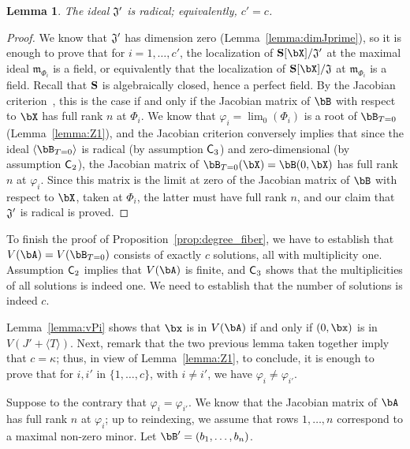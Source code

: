 \documentclass[12pt]{article}
\newtheorem{lemma}[definition]{Lemma}
\begin{document}
\begin{lemma}\label{lemma:Jprimerad}
  The ideal $\frak{J}'$ is radical; equivalently, $c'=c$.
\end{lemma}
\begin{proof}
  We know that $\frak{J}'$ has dimension zero
  (Lemma~\ref{lemma:dimJprime}), so it is enough to prove that for
  $i=1,\dots,c'$, the localization of $\SS[\bX]/\frak{J}'$ at the
  maximal ideal $\mathfrak{m}_{\Phi_i}$ is a field, or equi\-valently
  that the localization of $\SS[\bX]/\frak{J}$ at
  $\mathfrak{m}_{\Phi_i}$ is a field.  Recall that $\mathbf{S}$ is
  algebraically closed, hence a perfect field. By the Jacobian
  criterion~\cite[Theorem~16.19.b]{Eisenbud95}, this is the case if
  and only if the Jacobian matrix of $\bB$ with respect to $\bX$ has
  full rank $n$ at $\Phi_i$. We know that $\varphi_i=\lim_0(\Phi_i)$
  is a root of $\bB_{T=0}$ (Lemma~\ref{lemma:Z1}), and the Jacobian
  criterion conversely implies that since the ideal $\langle \bB_{T=0}
  \rangle$ is radical (by assumption $\mathsf{C}_3$) and zero-dimensional
  (by assumption $\mathsf{C}_2$), the Jacobian matrix of
  $\bB_{T=0}(\bX)=\bB(0,\bX)$ has full rank $n$ at $\varphi_i$. Since
  this matrix is the limit at zero of the Jacobian matrix of $\bB$
  with respect to $\bX$, taken at $\Phi_i$, the latter must have full
  rank $n$, and our claim that $\frak{J}'$ is radical is proved.
\end{proof}

To finish the proof of Proposition~\ref{prop:degree_fiber}, we have to
establish that $V(\bA)=V(\bB_{T=0})$ consists of exactly $c$ solutions, all
with multiplicity one. Assumption $\mathsf{C}_2$ implies that
$V(\bA)$ is finite, and $\mathsf{C}_3$ shows that the multiplicities
of all solutions is indeed one. We need to establish that the number of 
solutions is indeed $c$.

Lemma~\ref{lemma:vPi} shows that $\bx$ is in $V(\bA)$ if and only if
$(0,\bx)$ is in $V(J' + \langle T\rangle)$. Next, remark that the two
previous lemma taken together imply that $c=\kappa$; thus, in view of
Lemma~\ref{lemma:Z1}, to conclude, it is enough to prove that for
$i,i'$ in $\{1,\dots,c\}$, with $i \ne i'$, we have $\varphi_i \ne
\varphi_{i'}$.

Suppose to the contrary that $\varphi_i = \varphi_{i'}$. We know that
the Jacobian matrix of $\bA$ has full rank $n$ at $\varphi_i$; up to
reindexing, we assume that rows $1,\dots,n$ correspond to a maximal
non-zero minor. Let $\bB'=(b_1,\dots,b_n)$.
\end{document}
